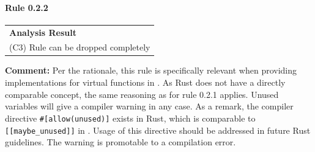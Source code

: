 \paragraph{Rule 0.2.2}
\begin{longtable}{p{13cm}}
\textbf{Analysis Result} \\
(C3) Rule can be dropped completely \\
\end{longtable}
\textbf{Comment:} Per the rationale, this rule is specifically relevant when providing implementations for virtual functions in \Cpp. As Rust does not have a directly comparable concept, the same reasoning as for rule 0.2.1 applies. Unused variables will give a compiler warning in any case. As a remark, the compiler directive \texttt{\#[allow(unused)]} exists in Rust, which is comparable to \texttt{[[maybe\_unused]]} in \Cpp. Usage of this directive should be addressed in future Rust guidelines. The warning is promotable to a compilation error. \\
